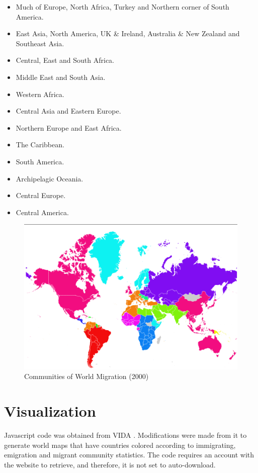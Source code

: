 \documentclass{acm_proc_article-sp}
\begin{document}
\begin{itemize}
\item Much of Europe, North Africa, Turkey and Northern corner of South America. 
\item East Asia, North America, UK \& Ireland, Australia \& New Zealand and Southeast Asia.
\item Central, East and South Africa. 
\item Middle East and South Asia.
\item Western Africa.
\item Central Asia and Eastern Europe.
\item Northern Europe and East Africa.
\item The Caribbean.
\item South America. 
\item Archipelagic Oceania.
\item Central Europe.
\item Central America.
\end{itemize}

\begin{figure}[h]
    \includegraphics[width=\columnwidth, keepaspectratio=true]{Migration_communities.png}
    \caption{Communities of World Migration (2000)}
    \label{fig:comm}
\end{figure}

\section{Visualization}
Javascript code was obtained from VIDA \cite{vida}. Modifications were made from it to generate world maps that have countries colored according to immigrating, emigration and migrant community statistics. The code requires an account with the website to retrieve, and therefore, it is not set to auto-download.
\end{document}
